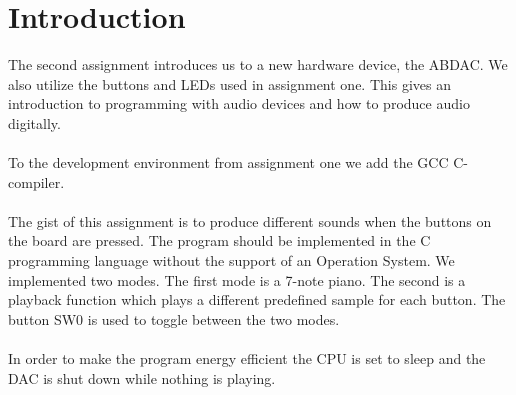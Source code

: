 \section{Introduction}
The second assignment introduces us to a new hardware device, the ABDAC. We also utilize
the buttons and LEDs used in assignment one. This gives an introduction to programming with
audio devices and how to produce audio digitally.\\
\\
To the development environment from assignment one we add the GCC C-compiler.\\
\\
The gist of this assignment is to produce different sounds when the buttons on the board are pressed.
The program should be implemented in the C programming language without the support of an
Operation System. We implemented two modes. The first mode is a 7-note piano. The second is a
playback function which plays a different predefined sample for each button. The button SW0
is used to toggle between the two modes.\\
\\
In order to make the program energy efficient the CPU is set to sleep and the DAC is shut 
down while nothing is playing. %
